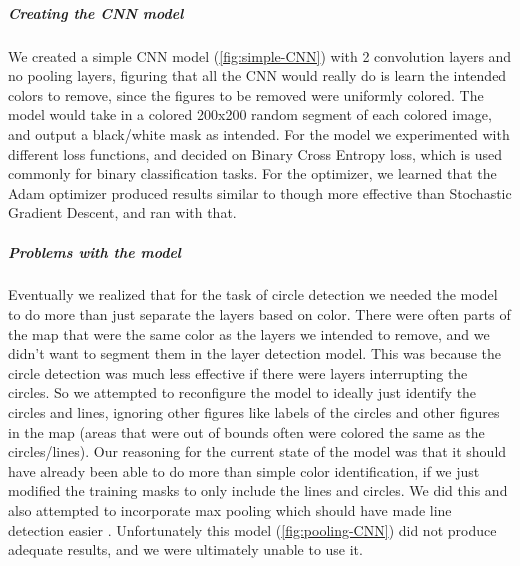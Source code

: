 \documentclass[a4paper,12pt]{extarticle}
\begin{document}
\subparagraph{Creating the CNN model\\}
We created a simple CNN model (\cref{fig:simple-CNN}) with 2 convolution layers and no pooling layers, figuring that all the CNN would really do is learn the intended colors to remove, since the figures to be removed were uniformly colored. The model would take in a colored 200x200 random segment of each colored image, and output a black/white mask as intended. For the model we experimented with different loss functions, and decided on Binary Cross Entropy loss, which is used commonly for binary classification tasks. For the optimizer, we learned that the Adam optimizer produced results similar to though more effective than Stochastic Gradient Descent, and ran with that.



\subparagraph{Problems with the model\\}
Eventually we realized that for the task of circle detection we needed the model to do more than just separate the layers based on color.
There were often parts of the map that were the same color as the layers we intended to remove, and we didn't want to segment them in the layer detection model.
This was because the circle detection was much less effective if there were layers interrupting the circles. So we attempted to reconfigure the model to ideally just identify the circles and lines, ignoring other figures like labels of the circles and other figures in the map (areas that were out of bounds often were colored the same as the circles/lines).
Our reasoning for the current state of the model was that it should have already been able to do more than simple color identification, if we just modified the training masks to only include the lines and circles. We did this and also attempted to incorporate max pooling which should have made line detection easier \cite{cnnsemanticsegmentation}. Unfortunately this model (\cref{fig:pooling-CNN}) did not produce adequate results, and we were ultimately unable to use it.
\end{document}
